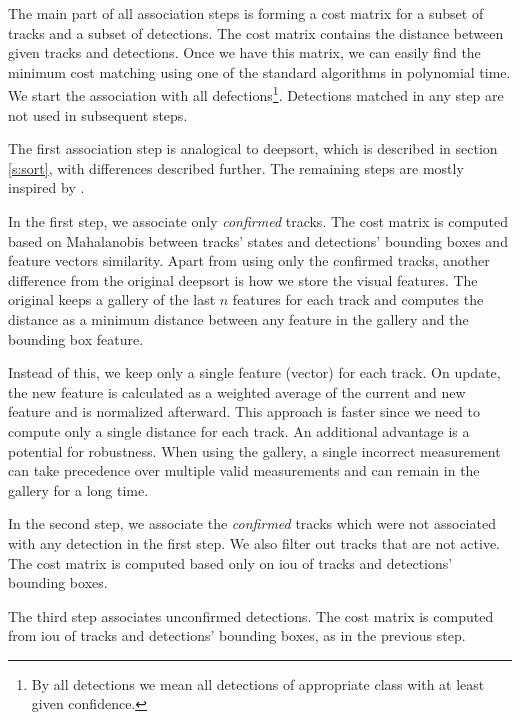 The main part of all association steps is forming a cost matrix for a subset of tracks and a subset of detections. The cost matrix contains the distance between given tracks and detections. Once we have this matrix, we can easily find the minimum cost matching using one of the standard algorithms in polynomial time\cite{kuhn1955hungarian, bourgeois1971extension_munkers}. We start the association with all defections\footnote{By all detections we mean all detections of appropriate class with at least given confidence.}. Detections matched in any step are not used in subsequent steps.

The first association step is analogical to \gls{deepsort}\cite{Wojke2017_DeepSORT}, which is described in section \ref{s:sort}, with differences described further. The remaining steps are mostly inspired by \cite{yukai_yang_2020_4294717_fastmot}.

In the first step, we associate only \textit{confirmed} tracks. The cost matrix is computed based on Mahalanobis between tracks' states and detections' bounding boxes and feature vectors similarity. Apart from using only the confirmed tracks, another difference from the original \gls{deepsort} is how we store the visual features. The original keeps a gallery of the last $n$ features for each track and computes the distance as a minimum distance between any feature in the gallery and the bounding box feature. 

Instead of this, we keep only a single feature (vector) for each track. On update, the new feature is calculated as a weighted average of the current and new feature and is normalized afterward. This approach is faster since we need to compute only a single distance for each track. An additional advantage is a potential for robustness. When using the gallery, a single incorrect measurement can take precedence over multiple valid measurements and can remain in the gallery for a long time. 

In the second step, we associate the \textit{confirmed} tracks which were not associated with any detection in the first step. We also filter out tracks that are not active. The cost matrix is computed based only on \gls{iou} of tracks and detections' bounding boxes.

The third step associates unconfirmed detections. The cost matrix is computed from \gls{iou} of tracks and detections' bounding boxes, as in the previous step.

